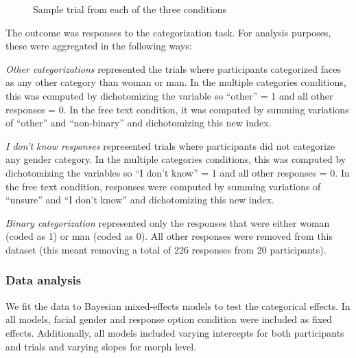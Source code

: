 \documentclass[
  man,
  longtable,
  nolmodern,
  notxfonts,
  notimes,
  colorlinks=true,linkcolor=blue,citecolor=blue,urlcolor=blue]{apa7}
\begin{document}
\begin{figure}

\caption{\label{fig-exp1-trial}Sample trial from each of the three
conditions}


\end{figure}%

The outcome was responses to the categorization task. For analysis
purposes, these were aggregated in the following ways:

\emph{Other categorizations} represented the trials where participants
categorized faces as any other category than woman or man. In the
multiple categories conditions, this was computed by dichotomizing the
variable so ``other'' = 1 and all other responses = 0. In the free text
condition, it was computed by summing variations of ``other'' and
``non-binary'' and dichotomizing this new index.

\emph{I don't know responses} represented trials where participants did
not categorize any gender category. In the multiple categories
conditions, this was computed by dichotomizing the variables so ``I
don't know'' = 1 and all other responses = 0. In the free text
condition, responses were computed by summing variations of ``unsure''
and ``I don't know'' and dichotomizing this new index.

\emph{Binary categorization} represented only the responses that were
either woman (coded as 1) or man (coded as 0). All other responses were
removed from this dataset (this meant removing a total of 226 responses
from 20 participants).

\subsubsection{Data analysis}\label{data-analysis-1}

We fit the data to Bayesian mixed-effects models to test the categorical
effects. In all models, facial gender and response option condition were
included as fixed effects. Additionally, all models included varying
intercepts for both participants and trials and varying slopes for morph
level.
\end{document}
